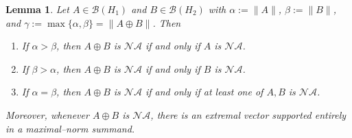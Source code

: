 \documentclass[12pt]{amsart}
\newtheorem{lemma}[theorem]{Lemma}
\theoremstyle{definition}
\theoremstyle{remark}
\newcommand{\clb}{\mathcal{B}}
\newcommand{\na}{\mathcal{NA}}
\numberwithin{equation}{section}
\begin{document}
\begin{lemma}\label{lem:direct-sum-NA}
Let $A\in \clb(H_1)$ and $B\in\clb(H_2)$ with $\alpha:=\|A\|$, $\beta:=\|B\|$, and $\gamma:=\max\{\alpha,\beta\}=\|A\oplus B\|$. Then
\begin{enumerate}
\item\label{alpha>beta} If $\alpha>\beta$, then $A\oplus B$ is $\na$ if and only if $A$ is $\na$.
\item\label{beta>alpha} If $\beta>\alpha$, then $A\oplus B$ is $\na$ if and only if $B$ is $\na$.
\item\label{alpha=beta} If $\alpha=\beta$, then $A\oplus B$ is $\na$ if and only if at least one of $A,B$ is $\na$.
\end{enumerate}
Moreover, whenever $A\oplus B$ is $\na$, there is an extremal vector supported entirely in a maximal–norm summand.
\end{lemma}
\end{document}
